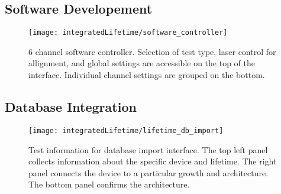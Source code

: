 \documentclass[../thesis.tex]{subfiles}
\begin{document}
\subsection{Software Developement}

\begin{figure}[ht]
    \centering
    \texttt{[image: integratedLifetime/software\_controller]}
\caption{6 channel software controller.  Selection of test type, laser control for allignment, and global settings are accessible on the top of the interface.  Individual channel settings are grouped on the bottom.}
\label{fig:software_controller}
\end{figure}

\subsection{Database Integration}
\begin{figure}[ht]
    \centering
    \texttt{[image: integratedLifetime/lifetime\_db\_import]}
\caption{Test information for database import interface.  The top left panel collects information about the specific device and lifetime.  The right panel connects the device to a particular growth and architecture.  The bottom panel confirms the architecture.}
\label{fig:lifetime_db_import}
\end{figure}


\end{document}

